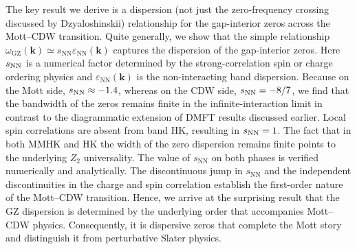 \documentclass[aps,prl,reprint,superscriptaddress,nofootinbib,longbibliography]{revtex4-1}
\newcommand{\epsk}{\varepsilon_{\mathrm{NN}}(\mathbf{k})}
\newcommand{\wzero}{\omega_{\mathrm{GZ}}}
\newcommand{\Figdisp}[1]{Figure \ref{#1}}
\begin{document}
The key result we derive is a dispersion (not just the zero-frequency crossing discussed by Dzyaloshinskii\cite{dzyaloshinskii2003zeros}) relationship for the gap-interior zeros across the Mott--CDW transition.  Quite generally, we show that the simple relationship $\wzero(\mathbf{k})\simeq s_{\mathrm{NN}}\epsk$ captures the dispersion of the gap-interior zeros.  Here $s_{\rm NN}$ is a numerical factor determined by the strong-correlation spin or charge ordering physics and $\epsk$ is the non-interacting band dispersion.  Because on the Mott side, $s_{\rm NN}\approx-1.4$, whereas on the CDW side, $s_{\rm NN}=-8/7$, we find that the bandwidth of the zeros remains finite  in the infinite-interaction limit in contrast to the diagrammatic extension of DMFT\cite{stepanov2024interconnected} results discussed earlier.  Local spin correlations are absent from band HK, resulting in $s_{\rm NN}=1$.  The fact that in both MMHK and HK the width of the zero dispersion remains finite points to the underlying $Z_2$ universality\cite{z2}. The value of $s_{\mathrm{NN}}$ on both phases is verified numerically and analytically. The discontinuous jump in $s_{\mathrm{NN}}$ and the independent discontinuities in the charge and spin correlation establish the first-order nature of the Mott--CDW transition. Hence, we arrive at the surprising result that the GZ dispersion is determined by the underlying order that accompanies Mott--CDW physics.  Consequently, it is dispersive zeros that complete the Mott story and distinguish it from perturbative Slater physics.

\end{document}
